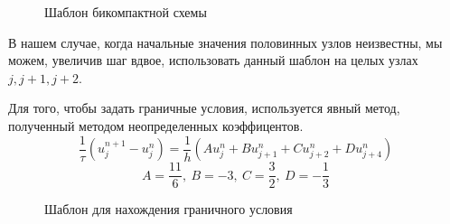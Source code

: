 \documentclass{article}
\begin{document}
\begin{figure}[h]
    \begin{minipage}[h]{0.49\linewidth}
    \end{minipage}
    \hfill
    \begin{minipage}[h]{0.49\linewidth}
    \end{minipage}
    \caption{Шаблон бикомпактной схемы}
    \label{ris:image1}
\end{figure}

В нашем случае, когда начальные значения половинных узлов неизвестны, мы можем, увеличив шаг вдвое, использовать данный шаблон на целых узлах $j,j+1,j+2$.

Для того, чтобы задать граничные условия, используется явный метод, полученный методом неопределенных коэффицентов.
$$\frac{1}{\tau}(u^{n+1}_j-u^{n}_j)=\frac{1}{h}(Au^{n}_j+Bu^{n}_{j+1}+Cu^{n}_{j+2}+Du^{n}_{j+4}) $$
$$A=\frac{11}{6},\:B=-3,\:C=\frac{3}{2},\:D=-\frac{1}{3}$$

\begin{figure}[h]
\caption{Шаблон для нахождения граничного условия}
\label{ris:image}
\end{figure}  
\end{document}
